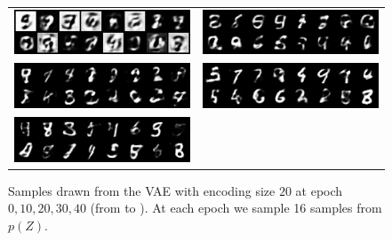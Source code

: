 \documentclass{article}
\begin{document}
\begin{figure}
  \centering
  \begin{tabularx}{\linewidth}{XX}
    \includegraphics[width=\linewidth]{assignment_3/code/figures/vae_sample_0.png} &
    \includegraphics[width=\linewidth]{assignment_3/code/figures/vae_sample_10.png} \\
    \includegraphics[width=\linewidth]{assignment_3/code/figures/vae_sample_20.png} &
    \includegraphics[width=\linewidth]{assignment_3/code/figures/vae_sample_30.png} \\
    \includegraphics[width=\linewidth]{assignment_3/code/figures/vae_sample_39.png}
  \end{tabularx}
  \caption{Samples drawn from the VAE with encoding size \(20\) at epoch \(0,10,20,30,40\) (from  to ). At each epoch we sample 16 samples from \(p(Z)\).}
  \label{fig:vae_samples}
\end{figure}
\end{document}
